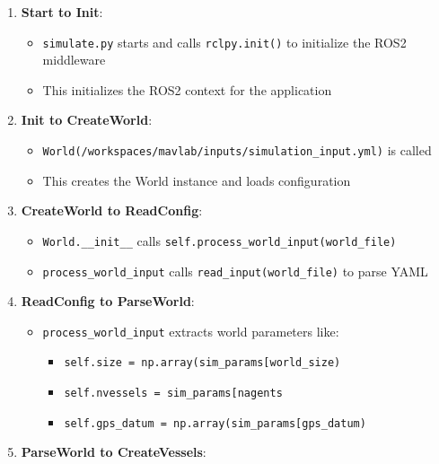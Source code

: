 \documentclass[
  letterpaper,
  DIV=11,
  numbers=noendperiod]{scrreprt}
\providecommand{\tightlist}{%
  \setlength{\itemsep}{0pt}\setlength{\parskip}{0pt}}\usepackage{longtable,booktabs,array}
\begin{document}
\begin{enumerate}
\def\labelenumi{\arabic{enumi}.}
\tightlist
\item
  \textbf{Start to Init}:

  \begin{itemize}
  \tightlist
  \item
    \texttt{simulate.py} starts and calls \texttt{rclpy.init()} to
    initialize the ROS2 middleware
  \item
    This initializes the ROS2 context for the application
  \end{itemize}
\item
  \textbf{Init to CreateWorld}:

  \begin{itemize}
  \tightlist
  \item
    \texttt{World(\textquotesingle{}/workspaces/mavlab/inputs/simulation\_input.yml\textquotesingle{})}
    is called
  \item
    This creates the World instance and loads configuration
  \end{itemize}
\item
  \textbf{CreateWorld to ReadConfig}:

  \begin{itemize}
  \tightlist
  \item
    \texttt{World.\_\_init\_\_} calls
    \texttt{self.process\_world\_input(world\_file)}
  \item
    \texttt{process\_world\_input} calls
    \texttt{read\_input(world\_file)} to parse YAML
  \end{itemize}
\item
  \textbf{ReadConfig to ParseWorld}:

  \begin{itemize}
  \tightlist
  \item
    \texttt{process\_world\_input} extracts world parameters like:

    \begin{itemize}
    \tightlist
    \item
      \texttt{self.size\ =\ np.array(sim\_params{[}\textquotesingle{}world\_size\textquotesingle{}{]})}
    \item
      \texttt{self.nvessels\ =\ sim\_params{[}\textquotesingle{}nagents\textquotesingle{}{]}}
    \item
      \texttt{self.gps\_datum\ =\ np.array(sim\_params{[}\textquotesingle{}gps\_datum\textquotesingle{}{]})}
    \end{itemize}
  \end{itemize}
\item
  \textbf{ParseWorld to CreateVessels}:


\end{enumerate}
\end{document}
